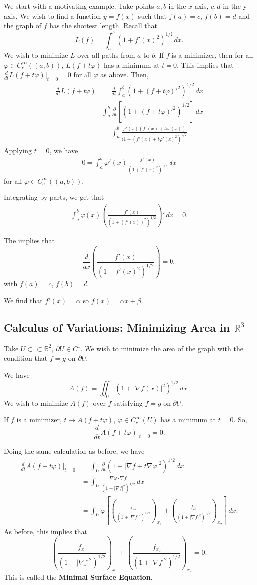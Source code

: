 \documentclass[12pt]{scrartcl}
\newcommand{\R}{\mathbb{R}}
\newcommand{\<}{\langle}
\renewcommand{\>}{\rangle}
\let \phi \varphi
\let \grad \nabla
\begin{document}
We start with a motivating example. Take points $a, b$ in the $x$-axis, $c, d$ in the y-axis.  We wish to find a function $y = f(x)$ such that $f(a) = c$, $f(b) = d$ and the graph of $f$ has the shortest length.  Recall that 
$$L(f) = \int_{a}^b (1 + f'(x)^2)^{1/2}\,dx.$$
We wish to minimize $L$ over all paths from $a$ to $b$.  If $f$ is a minimizer, then for all $\phi \in C_c^\infty((a, b))$, $L(f + t\phi)$ has a minimum at $t = 0$.  This implies that $\frac{d}{dt} L(f + t\phi)\vert_{t = 0} = 0$ for all $\phi$ as above.  Then,
\begin{align*}
\frac{d}{dt} L(f + t\phi) &= \frac{d}{dt} \int_{a}^b (1 + (f + t\phi)'^2)^{1/2}\,dx \\
&\int_{a}^b \frac{\partial}{\partial t} [(1 + (f + t\phi)'^2)^{1/2}]\,dx \\
&= \int_a^b \frac{\phi'(x) (f'(x) + t\phi'(x))}{(1 +(f'(x) + t\phi'(x)^2 )^{1/2}}
\end{align*}
Applying $t = 0$, we have
\begin{align*}
 0 = \int_a^b \phi'(x) \frac{f'(x)}{(1 + f'(x)^2)^{1/2}}\,dx
\end{align*}
for all $\phi \in C_c^\infty((a, b))$.

Integrating by parts, we get that 
\begin{align*}
\int_a^b \phi(x)\left (\frac{f'(x)}{(1 + (f'(x))^2)^{1/2}}\right )' \,dx = 0.
\end{align*}

The implies that 
$$\frac{d}{dx} \left (\frac{f'(x)}{(1 + f'(x)^2)^{1/2}}\right ) = 0,$$
with $f(a) = c$, $f(b) = d$.

We find that $f'(x) = \alpha$ so $f(x) = \alpha x + \beta$. 
\subsection{Calculus of Variations: Minimizing Area in $\R^3$}
Take $U \subset \subset \R^2$, $\partial U \in C^1$.  We wish to minimize the area of the graph with the condition that $f = g$ on $\partial U$.

We have 
$$A(f) = \iint_U (1 + |\grad f(x)|^2)^{1/2}\,dx.$$
We wish to minimize $A(f)$ over $f$ satisfying $f = g$ on $\partial U$.

If $f$ is a minimizer, $t \mapsto A(f + t\phi)$, $\phi \in C_c^\infty(U)$ has a minimum at $t = 0$.  So, $$\frac{d}{dt}A(f + t\phi) \vert_{t = 0} = 0.$$

Doing the same calculation as before, we have 
\begin{align*}
\frac{d}{dt} A(f + t\phi)\vert_{t = 0} &= \int_U \frac{\partial }{\partial t} (1 + |\grad f + t\grad \phi|^2)^{1/2}\,dx \\
&= \int_U \frac{\grad \phi \cdot \grad f}{(1 + |\grad f|^2)^{1/2}}\,dx \\
&= \int_U \phi \left [\left (\frac{f_{x_1}}{(1 + |\grad f|^2)^{1/2}}\right )_{x_1} + \left (\frac{f_{x_2}}{(1 + |\grad f|^2)^{1/2}}\right )_{x_2} \right ]\,dx.
\end{align*}
As before, this implies that 
$$\left (\frac{f_{x_1}}{(1 + |\grad f|^2)^{1/2}}\right )_{x_1} + \left (\frac{f_{x_2}}{(1 + |\grad f|^2)^{1/2}}\right )_{x_2} = 0.$$
This is called the \textbf{Minimal Surface Equation}.  
\end{document}
